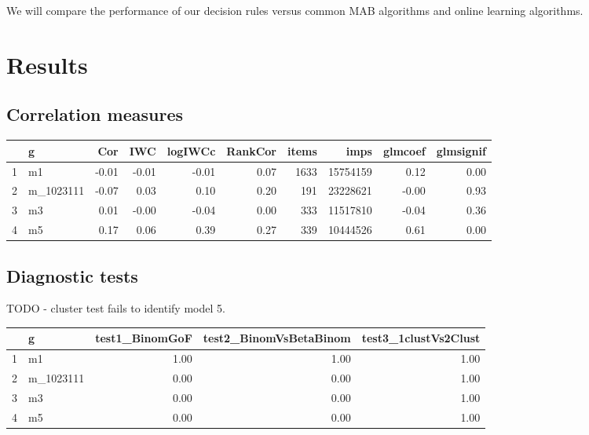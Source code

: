 \documentclass[12pt]{article}
\begin{document}
We will compare the performance of our decision rules versus common MAB algorithms and online learning algorithms.

\section{Results}

\subsection{Correlation measures}

\begin{table}[ht]
\centering
\begin{tabular}{rlrrrrrrrr}
  \hline
 & g & Cor & IWC & logIWCc & RankCor & items & imps & glmcoef & glmsignif \\ 
  \hline
1 & m1 & -0.01 & -0.01 & -0.01 & 0.07 & 1633 & 15754159 & 0.12 & 0.00 \\ 
  2 & m\_1023111 & -0.07 & 0.03 & 0.10 & 0.20 & 191 & 23228621 & -0.00 & 0.93 \\ 
  3 & m3 & 0.01 & -0.00 & -0.04 & 0.00 & 333 & 11517810 & -0.04 & 0.36 \\ 
  4 & m5 & 0.17 & 0.06 & 0.39 & 0.27 & 339 & 10444526 & 0.61 & 0.00 \\ 
   \hline
\end{tabular}
\end{table}

\subsection{Diagnostic tests}

TODO - cluster test fails to identify model 5.

\begin{table}[ht]
\centering
\begin{tabular}{rlrrr}
  \hline
 & g & test1\_BinomGoF & test2\_BinomVsBetaBinom & test3\_1clustVs2Clust \\ 
  \hline
1 & m1 & 1.00 & 1.00 & 1.00 \\ 
  2 & m\_1023111 & 0.00 & 0.00 & 1.00 \\ 
  3 & m3 & 0.00 & 0.00 & 1.00 \\ 
  4 & m5 & 0.00 & 0.00 & 1.00 \\ 
   \hline
\end{tabular}
\end{table}
\end{document}
